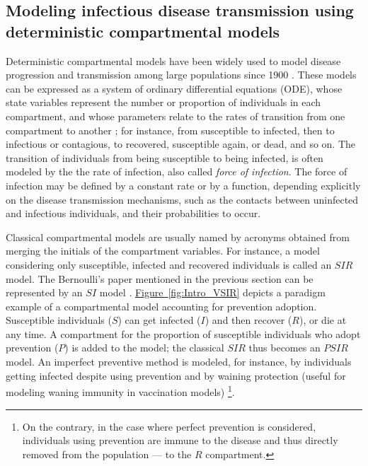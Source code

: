 							
\subsection{Modeling infectious disease transmission using deterministic compartmental models}

Deterministic compartmental models have been widely used to model disease progression and transmission among large populations since 1900 \cite[]{Brauer2017}. These models can be expressed as a system of ordinary differential equations (ODE), whose state variables represent the number or proportion of individuals in each compartment, and whose parameters relate to the rates of transition from one compartment to another \cite[]{Hethcote2000}; for instance, from susceptible to infected, then to infectious or contagious, to recovered, susceptible again, or dead, and so on. The transition of individuals from being susceptible to being infected, is often modeled by the the rate of infection, also called \textit{force of infection}. The force of infection may be defined by a constant rate or by a function, depending explicitly on the disease transmission mechanisms, such as the contacts between uninfected and infectious individuals, and their probabilities to occur. 

Classical compartmental models are usually named by acronyms obtained from merging the initials of the compartment variables. For instance, a model considering only susceptible, infected and recovered individuals is called an $SIR$ model. The Bernoulli's paper mentioned in the previous section can be represented by an $SI$ model \cite[]{Dietz2002}. \hyperlink{fig:Intro_VSIR}{Figure~\ref*{fig:Intro_VSIR}} depicts a paradigm example of a compartmental model accounting for prevention adoption. Susceptible individuals ($S$) can get infected ($I$) and then recover ($R$), or die at any time. A compartment for the proportion of susceptible individuals who adopt prevention ($P$) is added to the model; the classical $SIR$ thus becomes an $PSIR$ model. An imperfect preventive method is modeled, for instance, by individuals getting infected despite using prevention and by waining protection (useful for modeling waning immunity in vaccination models) \footnote{On the contrary, in the case where perfect prevention is considered,  individuals using prevention are immune to the disease and thus directly removed from the population --- to the $R$ compartment.}. 

